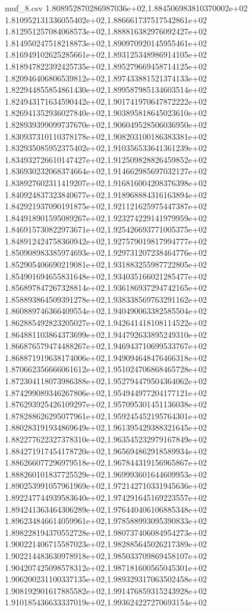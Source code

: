 \begin{filecontents*}{muf_8.csv}
1.808952870286987036e+02,1.884506983810370002e+02
1.810952131336055402e+02,1.886661737517542861e+02
1.812951257084068573e+02,1.888816382976092427e+02
1.814950247518218873e+02,1.890970920145955461e+02
1.816949102625285661e+02,1.893125348986914105e+02
1.818947822392425735e+02,1.895279669458714125e+02
1.820946406806539812e+02,1.897433881521374133e+02
1.822944855854861430e+02,1.899587985134603514e+02
1.824943171634590442e+02,1.901741970647872222e+02
1.826941352936027840e+02,1.903895818645023610e+02
1.828939399099737670e+02,1.906049528506036950e+02
1.830937310110378178e+02,1.908203100186383381e+02
1.832935085952375402e+02,1.910356533641361239e+02
1.834932726610147427e+02,1.912509828826459852e+02
1.836930232068374664e+02,1.914662985697032127e+02
1.838927602311419207e+02,1.916816004208376398e+02
1.840924837323840677e+02,1.918968884316163894e+02
1.842921937090191875e+02,1.921121625975447387e+02
1.844918901595089267e+02,1.923274229141979959e+02
1.846915730822973671e+02,1.925426693771005375e+02
1.848912424758360942e+02,1.927579019817994777e+02
1.850908983385974693e+02,1.929731207238464776e+02
1.852905406690219081e+02,1.931883255987722805e+02
1.854901694655831648e+02,1.934035166021285477e+02
1.856897847267328814e+02,1.936186937294742165e+02
1.858893864509391278e+02,1.938338569763291162e+02
1.860889746366409554e+02,1.940490063382585504e+02
1.862885492823205027e+02,1.942641418108114522e+02
1.864881103864373699e+02,1.944792633895249310e+02
1.866876579474488267e+02,1.946943710699533767e+02
1.868871919638174006e+02,1.949094648476466318e+02
1.870662356666061612e+02,1.951024706868465728e+02
1.872304118073986388e+02,1.952794479504364062e+02
1.874299089346267806e+02,1.954944977204177121e+02
1.876293925426109297e+02,1.957095301451136038e+02
1.878288626295077961e+02,1.959245452195764301e+02
1.880283191934869649e+02,1.961395429388321645e+02
1.882277622327378310e+02,1.963545232979167849e+02
1.884271917454178720e+02,1.965694862918589934e+02
1.886266077296979518e+02,1.967844319156965867e+02
1.888260101837725529e+02,1.969993601644609953e+02
1.890253991057961969e+02,1.972142710331945636e+02
1.892247744939583640e+02,1.974291645169223557e+02
1.894241363464306289e+02,1.976440406106885348e+02
1.896234846614059961e+02,1.978588993095390833e+02
1.898228194370552728e+02,1.980737406084954273e+02
1.900221406715587023e+02,1.982885645026217389e+02
1.902214483630978918e+02,1.985033709869458107e+02
1.904207425098578312e+02,1.987181600565045301e+02
1.906200231100337135e+02,1.989329317063502458e+02
1.908192901617885582e+02,1.991476859315243928e+02
1.910185436633337019e+02,1.993624227270693154e+02

\end{filecontents*}
